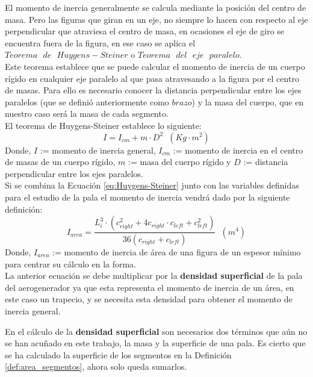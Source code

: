 El momento de inercia generalmente se calcula mediante la posición del centro de masa. Pero las figuras que giran en un eje, no siempre lo hacen con respecto al eje perpendicular que atraviesa el centro de masa, en ocasiones el eje de giro se encuentra fuera de la figura, en ese caso se aplica el $Teorema \text{ } de \text{ } Huygens-Steiner$ o $Teorema \text{ } del \text{ } eje \text{ } paralelo$. \\

Este teorema establece que se puede calcular el momento de inercia de un cuerpo rígido en cualquier eje paralelo al que pasa atravesando a la figura por el centro de masas. Para ello es necesario conocer la distancia perpendicular entre los ejes paralelos (que se definió anteriormente como $brazo$) y la masa del cuerpo, que en nuestro caso será la masa de cada segmento. \\

El teorema de Huygens-Steiner establece lo siguiente:
 \begin{equation}
    I = I_{cm} + m \cdot D^2 \hspace{7pt} (Kg \cdot m^2)
 \label{eq:Huygens-Steiner}
 \end{equation}
 Donde, $I$ := momento de inercia general, $I_{cm}$ := momento de inercia en el centro de masas de un cuerpo rígido, $m$ := masa del cuerpo rígido y $D$ := distancia perpendicular entre los ejes paralelos.\\
 
 

Si se combina la Ecuación \ref{eq:Huygens-Steiner} junto con las variables definidas para el estudio de la pala el momento de inercia vendrá dado por la siguiente definición:
 \begin{equation}
  I_{area} = \dfrac{ L_{i}^3 \cdot (c_{right}^2 + 4 c_{right} \cdot c_{left} + c_{left}^2)}{ 36 (c_{right} + c_{left})} \hspace{7pt} (m^4)
 \label{def:momento_inercia_area}
 \end{equation}
 Donde, $I_{area}$ := momento de inercia de área de una figura de un espesor mínimo para centrar su cálculo en la forma.\\
 
 La anterior ecuación se debe multiplicar por la \textbf{densidad superficial} de la pala del aerogenerador ya que esta representa el momento de inercia de un área, en este caso un trapecio, y se necesita esta densidad para obtener el momento de inercia general.

En el cálculo de la \textbf{densidad superficial} son necesarios dos términos que aún no se han acuñado en este trabajo, la masa y la superficie de una pala. Es cierto que se ha calculado la superficie de los segmentos en la Definición \ref{def:area_segmentos}, ahora solo queda sumarlos.\\


